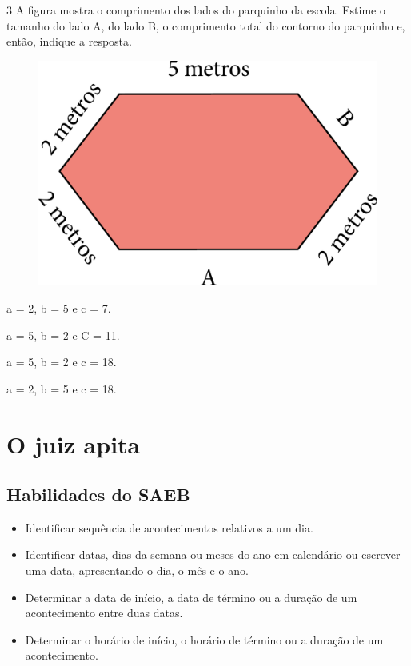 \num{3} A figura mostra o comprimento dos lados do parquinho da escola.
Estime o tamanho do lado A, do lado B, o comprimento total do contorno
do parquinho e, então, indique a resposta.

\begin{figure}[H]
\centering
\includegraphics[width=.6\textwidth]{./media/image47.png}
\end{figure}

\begin{escolha}[itemsep=-5pt]
\item a = 2, b = 5 e c = 7.

\item a = 5, b = 2 e C = 11.

\item a = 5, b = 2 e c = 18.

\item a = 2, b = 5 e c = 18.
\end{escolha}

\chapter{O juiz apita}

\vspace*{-1cm}

\section*{Habilidades do SAEB}

\begin{itemize}
\item Identificar sequência de acontecimentos relativos a um dia.

\item Identificar datas, dias da semana ou meses do ano em calendário ou
escrever uma data, apresentando o dia, o mês e o ano.

\item Determinar a data de início, a data de término ou a duração de um
acontecimento entre duas datas.

\item Determinar o horário de início, o horário de término ou a duração de
um acontecimento.
\end{itemize}

